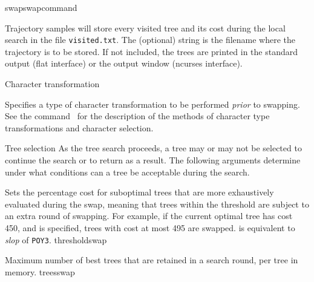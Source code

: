 \begin{command}{swap}{swapcommand}
\begin{arguments}
\begin{argumentgroup}{Trajectory samples}
            { will store every visited tree
            and its cost during the local search in the file
            \texttt{visited.txt}. The (optional) string is the filename where the
            trajectory is to be stored. If not included, the trees are printed
            in the standard output (flat interface) or the output window (ncurses
            interface).}
            {}
    
    \end{argumentgroup}

        \begin{argumentgroup}{Character transformation} {}
	    
                {Specifies a type of character transformation to be performed
                \emph{prior} to swapping.
                See the command~ for
                the description of the methods of character type transformations
                and character selection.}
                {}
        \end{argumentgroup}
            
        \begin{argumentgroup}{Tree selection}
            {As the tree search proceeds, a tree may or may not be selected to
            continue the search or to return as a result. The following
            arguments determine under what conditions can a tree be acceptable
            during the search.}

                {Sets the percentage cost for suboptimal
                trees that are more exhaustively evaluated during the swap,
                meaning that trees within the threshold are subject to an extra
                round of swapping. For example, if the current
                optimal tree has cost 450, and  is specified, trees
                with cost at most 495 are swapped.   is
                equivalent to \emph{slop} of  \texttt{POY3}.}
                {thresholdswap}

                {Maximum number of best trees that are retained in a search round,
                per tree in memory.}
                {treesswap}

        \end{argumentgroup}
    

\end{arguments}
\end{command}
